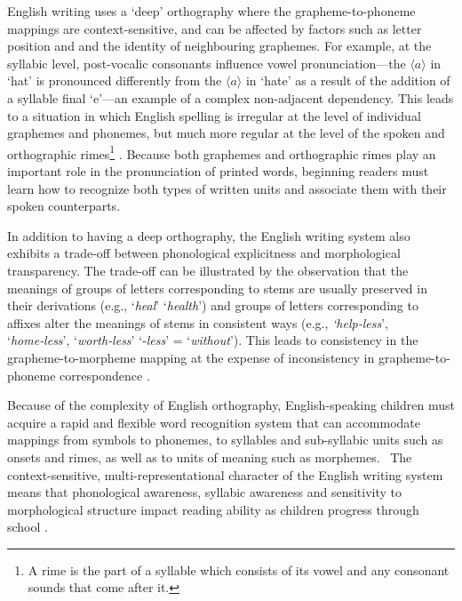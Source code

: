 \documentclass[review]{elsarticle}
\begin{document}
English writing uses a ‘deep’  orthography where the grapheme-to-phoneme mappings are  context-sensitive, and  can be affected by factors such as letter position and and the identity of neighbouring graphemes. For example, at the syllabic level, post-vocalic consonants influence vowel pronunciation---the $\langle a\rangle$ in `hat’ is pronounced differently from the  $\langle a\rangle$ in ‘hate’ as a result of the addition of a syllable final ‘e’---an example of a complex non-adjacent dependency. This leads to a situation in which English spelling is irregular at the level of individual graphemes and phonemes, but much more regular at the level of the spoken and orthographic rimes\footnote{A rime is the part of a syllable which consists of its vowel and any consonant sounds that come after it.} \citep{treimanSpecialRoleRimes1995}. Because both graphemes and orthographic rimes play an important role in the pronunciation of printed words, beginning readers must learn how to recognize both types of written units and associate them with their spoken counterparts.

In addition to having a deep orthography, the English writing system also exhibits a trade-off between phonological explicitness and morphological transparency. The trade-off can be illustrated by the observation that the meanings of groups of letters corresponding to stems are usually preserved in their derivations (e.g., ‘\textit{heal}’ \textrightarrow ‘\textit{health}’) and groups of letters corresponding to affixes alter the meanings of stems in consistent ways (e.g., \textit{‘help‑less}’, ‘\textit{home‑less}’, ‘\textit{worth‑less}’ \textrightarrow ‘‑\textit{less}’ = ‘\textit{without}’).  This leads to consistency in the grapheme-to-morpheme mapping at the expense of inconsistency in grapheme-to-phoneme correspondence \citep{zieglerReadingAcquisitionDevelopmental2005,rastlePlaceMorphologyLearning2019}.

Because of the complexity of English orthography, English-speaking children must acquire a rapid and flexible word recognition system that can accommodate mappings from symbols to phonemes, to syllables and sub-syllabic units such as onsets and rimes, as well as to units of meaning such as morphemes.  The context-sensitive, multi-representational character of the English writing system means that  phonological awareness, syllabic awareness and sensitivity to morphological structure impact reading ability as children progress through school \citep{mahonyReadingAbilitySensitivity2000}.  
\end{document}
